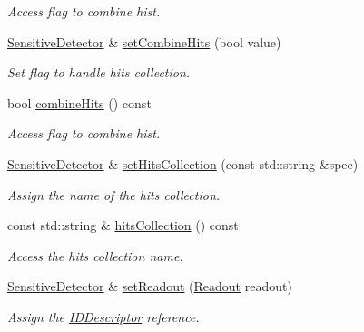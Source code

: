 \begin{DoxyCompactItemize}
\begin{DoxyCompactList}\small\item\em Access flag to combine hist. \item\end{DoxyCompactList}\item 
\hyperlink{class_d_d4hep_1_1_geometry_1_1_sensitive_detector}{SensitiveDetector} \& \hyperlink{class_d_d4hep_1_1_geometry_1_1_sensitive_detector_a934bd9f3b3c239b6fc751f2b68b26016}{setCombineHits} (bool value)
\begin{DoxyCompactList}\small\item\em Set flag to handle hits collection. \item\end{DoxyCompactList}\item 
bool \hyperlink{class_d_d4hep_1_1_geometry_1_1_sensitive_detector_abaf71c3bc08b34c07e7a492e4e9c1b98}{combineHits} () const 
\begin{DoxyCompactList}\small\item\em Access flag to combine hist. \item\end{DoxyCompactList}\item 
\hyperlink{class_d_d4hep_1_1_geometry_1_1_sensitive_detector}{SensitiveDetector} \& \hyperlink{class_d_d4hep_1_1_geometry_1_1_sensitive_detector_af3b9212ce097d49f2d2de8bc625ac3e6}{setHitsCollection} (const std::string \&spec)
\begin{DoxyCompactList}\small\item\em Assign the name of the hits collection. \item\end{DoxyCompactList}\item 
const std::string \& \hyperlink{class_d_d4hep_1_1_geometry_1_1_sensitive_detector_a11b8c25eaa4c3da343abee5e796b62f7}{hitsCollection} () const 
\begin{DoxyCompactList}\small\item\em Access the hits collection name. \item\end{DoxyCompactList}\item 
\hyperlink{class_d_d4hep_1_1_geometry_1_1_sensitive_detector}{SensitiveDetector} \& \hyperlink{class_d_d4hep_1_1_geometry_1_1_sensitive_detector_a8f7a8a0c01fbddbfd645d19171d78f22}{setReadout} (\hyperlink{class_d_d4hep_1_1_geometry_1_1_readout}{Readout} readout)
\begin{DoxyCompactList}\small\item\em Assign the \hyperlink{class_d_d4hep_1_1_geometry_1_1_i_d_descriptor}{IDDescriptor} reference. \item\end{DoxyCompactList}\item 

\end{DoxyCompactItemize}
